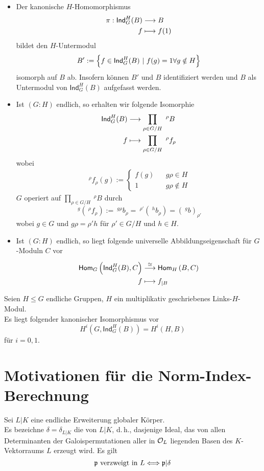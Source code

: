 \documentclass{book}
\newcommand{\pf}{\mathfrak{p}}
\begin{document}
\Bem{}
\begin{itemize}
\item Der kanonische $H$-Homomorphismus
\begin{align*}
\pi : \textsf{Ind}^H_G(B) & \overset{}{\longrightarrow} B\\
f & \longmapsto f(1)
\end{align*}
bildet den $H$-Untermodul
\[ B' := \set{f \in \textsf{Ind}_G^H(B)}{ f(g) = 1 \forall g \notin H } \]
isomorph auf $B$ ab. Insofern können $B'$ und $B$ identifiziert werden und $B$ als Untermodul von $\textsf{Ind}^H_G(B)$ aufgefasst werden.
\item Ist $(G:H)$ endlich, so erhalten wir folgende Isomorphie
\begin{align*}
\textsf{Ind}_G^H(B) &\overset{}{\longrightarrow} \prod_{\rho \in G/H} \ ^\rho B\\
f & \longmapsto \prod_{\rho \in G/H} \ ^\rho f_{\rho}
\end{align*}
wobei
\begin{align*}
\ ^\rho f_{\rho} (g) := \left\lbrace
\begin{aligned}
f(g) && g\rho \in H\\
1 && g\rho \notin H
\end{aligned}
\right.
\end{align*}
$G$ operiert auf $\prod_{\rho \in G/H} \ ^\rho B$ durch
\[ \ ^g(\ ^\rho f_{\rho}) := \ ^{g\rho}b_\rho = \ ^{\rho'}(\ ^{h}b_\rho) = (\ ^gb)_{\rho'} \]
wobei $g \in G$ und $g\rho = \rho' h$ für $\rho' \in G/H$ und $h \in H$.
\item Ist $(G:H)$ endlich, so liegt folgende universelle Abbildungseigenschaft für $G$-Moduln $C$ vor
\begin{align*}
\textsf{Hom}_{G}\left(\textsf{Ind}_G^H(B), C\right) &\overset{\overset{}{\cong}}{\longrightarrow} \textsf{Hom}_{H}\left(B, C\right)\\
f& \longmapsto f_{|B}
\end{align*}
\end{itemize}

\Satz{}
Seien $H\leq G$ endliche Gruppen, $H$ ein multiplikativ geschriebenes Links-$H$-Modul.\\
Es liegt folgender kanonischer Isomorphismus vor
\[ H^i(G, \textsf{Ind}_G^H(B)) = H^i(H,B) \]
für $i = 0,1$.

\section{Motivationen für die Norm-Index-Berechnung}
\Bem{}
Sei $L|K$ eine endliche Erweiterung globaler Körper.\\
Es bezeichne $\delta = \delta_{L|K}$ die  von $L|K$, d.\,h., dasjenige Ideal, das von allen Determinanten der Galoispermutationen aller in $\mathcal{O}_L$ liegenden Basen des $K$-Vektorraums $L$ erzeugt wird. Es gilt
\[ \pf \text{ verzweigt in }L \Gdw{} \pf | \delta \]
\end{document}
